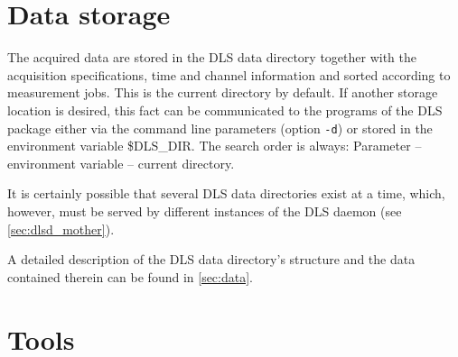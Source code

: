 \documentclass[a4paper,12pt,BCOR6mm,bibtotoc,idxtotoc]{scrbook}
\begin{document}

\section{Data storage}
\label{sec:allg_ablage}

The acquired data are stored in the DLS data directory together with the acquisition specifications, time and channel
information and sorted according to measurement jobs. This is the current
directory by default. If another storage location is desired, this fact can be
communicated to the programs of the DLS package either via the command line
parameters (option \texttt{-d}) or stored in the environment variable
\$DLS\_DIR. The search order is always: Parameter --
environment variable -- current directory.

It is certainly possible that several DLS data directories exist at a time,
which, however, must be served by different instances of the DLS daemon (see
\autoref{sec:dlsd_mother}).

A detailed description of the DLS data directory’s structure and the data
contained therein can be found in \autoref{sec:data}.


\section{Tools}
\label{sec:allg_tools}
\end{document}
